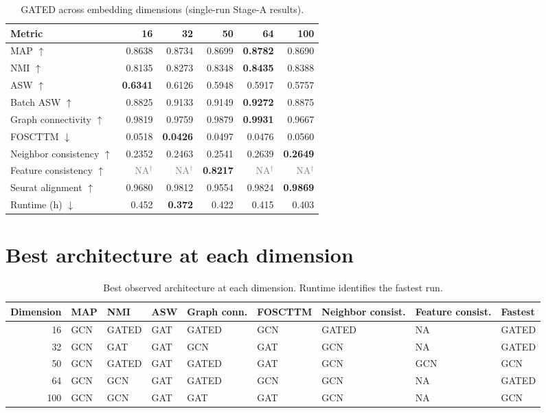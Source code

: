 \documentclass[10pt]{article}
\begin{document}
\begin{table}[H]
\centering
\scriptsize
\caption{GATED across embedding dimensions (single-run Stage-A results).}
\begin{tabular}{@{}lrrrrr@{}}
\toprule
Metric & 16 & 32 & 50 & 64 & 100 \\
\midrule
MAP $\uparrow$ & 0.8638 & 0.8734 & 0.8699 & \textbf{0.8782} & 0.8690 \\
NMI $\uparrow$ & 0.8135 & 0.8273 & 0.8348 & \textbf{0.8435} & 0.8388 \\
ASW $\uparrow$ & \textbf{0.6341} & 0.6126 & 0.5948 & 0.5917 & 0.5757 \\
Batch ASW $\uparrow$ & 0.8825 & 0.9133 & 0.9149 & \textbf{0.9272} & 0.8875 \\
Graph connectivity $\uparrow$ & 0.9819 & 0.9759 & 0.9879 & \textbf{0.9931} & 0.9667 \\
FOSCTTM $\downarrow$ & 0.0518 & \textbf{0.0426} & 0.0497 & 0.0476 & 0.0560 \\
Neighbor consistency $\uparrow$ & 0.2352 & 0.2463 & 0.2541 & 0.2639 & \textbf{0.2649} \\
Feature consistency $\uparrow$ & \textcolor{gray}{NA$^{\dagger}$} & \textcolor{gray}{NA$^{\dagger}$} & \textbf{0.8217} & \textcolor{gray}{NA$^{\dagger}$} & \textcolor{gray}{NA$^{\dagger}$} \\
Seurat alignment $\uparrow$ & 0.9680 & 0.9812 & 0.9554 & 0.9824 & \textbf{0.9869} \\
Runtime (h) $\downarrow$ & 0.452 & \textbf{0.372} & 0.422 & 0.415 & 0.403 \\
\bottomrule
\end{tabular}
\end{table}
\section{Best architecture at each dimension}
\begin{landscape}
\begin{table}[H]
\centering
\scriptsize
\caption{Best observed architecture at each dimension. Runtime identifies the fastest run.}
\begin{tabular}{@{}rllllllll@{}}
\toprule
Dimension & MAP & NMI & ASW & Graph conn. & FOSCTTM & Neighbor consist. & Feature consist. & Fastest \\
\midrule
16 & GCN & GATED & GAT & GATED & GCN & GATED & NA & GATED \\
32 & GCN & GAT & GAT & GCN & GAT & GCN & NA & GATED \\
50 & GCN & GATED & GAT & GATED & GAT & GCN & GCN & GCN \\
64 & GCN & GCN & GAT & GATED & GCN & GCN & NA & GATED \\
100 & GCN & GCN & GAT & GAT & GAT & GCN & NA & GCN \\
\bottomrule
\end{tabular}
\end{table}
\end{landscape}
\end{document}
